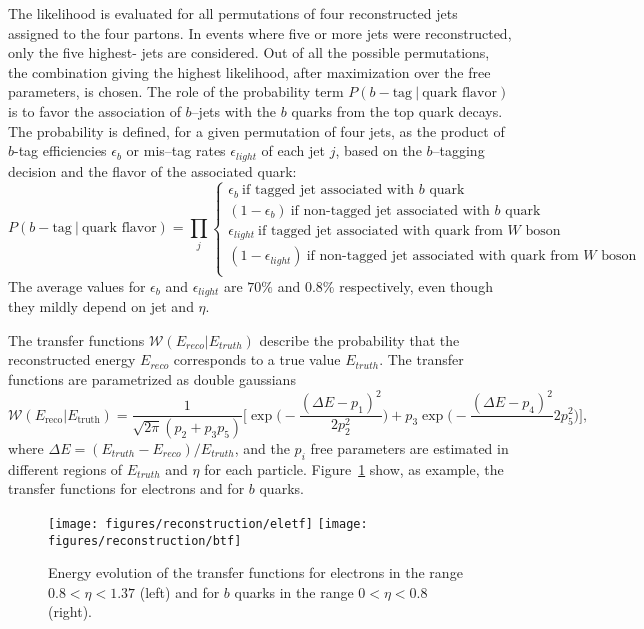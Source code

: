 The likelihood is evaluated for all permutations of four reconstructed
jets assigned to the four partons.
In events where five or more jets were reconstructed, only
the five highest-\pt{} jets are considered. 
Out of all the possible permutations, the combination giving the
highest likelihood, after maximization over the free parameters, is chosen.
The role of the probability term $P(b-\textrm{tag} ~|
~\textrm{quark flavor})$ is to favor the association of $b$--jets with
the $b$ quarks from the top quark decays. The probability is defined,
for a given permutation of four jets, as the product of $b$-tag
efficiencies $\epsilon_b$ or mis--tag rates $\epsilon_{light}$ of each
jet $j$, based on the $b$--tagging decision and the flavor of the
associated quark:
\begin{equation}
P(b-\textrm{tag}~|~\textrm{quark flavor}) = \prod_{j}
\begin{cases}
\epsilon_b~\text{if tagged jet associated with $b$ quark}\\
(1-\epsilon_b)~\text{if non-tagged jet associated with $b$ quark} \\
\epsilon_{light}~\text{if tagged jet associated with quark from
  $W$ boson} \\
(1-\epsilon_{light})~\text{if non-tagged jet associated with quark from
  $W$ boson} \\
\end{cases}
\end{equation} 
The average values for $\epsilon_b$ and $\epsilon_{light}$ are $70\%$
and $0.8\%$ respectively, even though they mildly depend on
jet \pt{} and $\eta$. 

The transfer functions $\mathcal{W}(E_{reco}|E_{truth})$ describe the probability that the
reconstructed energy $E_{reco}$ corresponds to a true value
$E_{truth}$.
The transfer functions are parametrized as double gaussians
\begin{equation}
  \label{eq:doublegaus}
  \mathcal{W}(E_\mathrm{reco}|E_\mathrm{truth}) = \frac{1}{\sqrt{2\pi}(p_2+p_3p_5)}\Bigg[ \exp\Bigg(-\frac{(\Delta E - p_1)^2}{2p_2^2}\Bigg) + p_3\exp\Bigg(-\frac{(\Delta E - p_4)^2}\
  {2p_5^2}\Bigg) \Bigg],
\end{equation}
where $\Delta E = (E_{truth}-E_{reco})/E_{truth}$, and the $p_i$
free parameters are estimated in different regions of $E_{truth}$ and
$\eta$ for each particle. Figure~\ref{fig:transferfunctions} show, as
example, the transfer functions for electrons and for $b$ quarks.

\begin{figure}[!htb]\centering
  \texttt{[image: figures/reconstruction/eletf]}
  \texttt{[image: figures/reconstruction/btf]}
  \caption[Energy evolution of transfer functions]{
    Energy evolution of the transfer functions for electrons in the
    range $0.8<\eta<1.37$ (left) and for $b$ quarks in the range
    $0<\eta<0.8$ (right). 
    \label{fig:transferfunctions}
    }
\end{figure}

